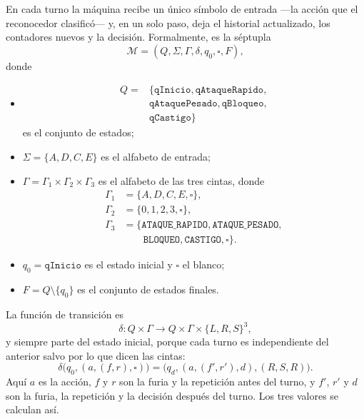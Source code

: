 \documentclass[9pt]{ieeeconf}
\newcommand{\TM}{\mathcal{M}}
\begin{document}
En cada turno la máquina recibe un único símbolo de entrada ---la acción que el reconocedor clasificó--- y, en un solo paso, deja el historial actualizado, los contadores nuevos y la decisión. Formalmente, es la séptupla
\begin{equation}
  \TM=(Q,\Sigma,\Gamma,\delta,q_0,\square,F),
  \label{eq:maquina}
\end{equation}
donde
\begin{itemize}
  \item {\scriptsize
  \[
  \begin{aligned}
  Q={}&\{\texttt{qInicio},\texttt{qAtaqueRapido},\\
  &\texttt{qAtaquePesado},\texttt{qBloqueo},\\
  &\texttt{qCastigo}\}
  \end{aligned}
  \]
  \noindent es el conjunto de estados;}
  \item $\Sigma=\{A,D,C,E\}$ es el alfabeto de entrada;
  \item {\small
  $\Gamma=\Gamma_1\times\Gamma_2\times\Gamma_3$ es el alfabeto de las tres cintas, donde}
  {\setlength{\jot}{2pt}
  \small
  \[
  \begin{aligned}
  \Gamma_1&=\{A,D,C,E,\square\},\\
  \Gamma_2&=\{0,1,2,3,\square\},\\
  \Gamma_3&=\{\texttt{ATAQUE\_RAPIDO},\texttt{ATAQUE\_PESADO},\\
  &\qquad\texttt{BLOQUEO},\texttt{CASTIGO},\square\}.
  \end{aligned}
  \]}
  \item $q_0=\texttt{qInicio}$ es el estado inicial y $\square$ el blanco;
  \item $F=Q\setminus\{q_0\}$ es el conjunto de estados finales.
\end{itemize}
La función de transición es
\begin{equation}
  \delta: Q\times\Gamma \longrightarrow Q\times\Gamma\times\{L,R,S\}^3,
  \label{eq:delta-enemigo}
\end{equation}
y siempre parte del estado inicial, porque cada turno es independiente del anterior salvo por lo que dicen las cintas:
\begin{equation}
  \delta\big(q_0,(a,(f,r),\square)\big)=\big(q_d,(a,(f',r'),d),(R,S,R)\big).
  \label{eq:paso}
\end{equation}
Aquí $a$ es la acción, $f$ y $r$ son la furia y la repetición antes del turno, y $f'$, $r'$ y $d$ son la furia, la repetición y la decisión después del turno. Los tres valores se calculan así.
\end{document}
